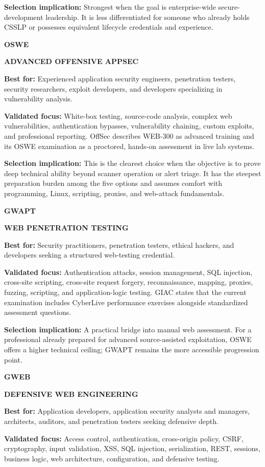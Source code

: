 \documentclass[11pt]{article}
\newcommand{\credential}[2]{%
  \Needspace{8\baselineskip}%
  \vspace{2pt}
  {\large\bfseries\color{Navy}#1}\hfill
  \colorbox{Sky}{\strut\small\bfseries\color{Blue}#2}
  \par\vspace{2pt}
}
\begin{document}
\textbf{Selection implication:} Strongest when the goal is enterprise-wide
secure-development leadership. It is less differentiated for someone who already
holds CSSLP or possesses equivalent lifecycle credentials and experience.

\credential{OSWE}{ADVANCED OFFENSIVE APPSEC}
\textbf{Best for:} Experienced application security engineers, penetration
testers, security researchers, exploit developers, and developers specializing in
vulnerability analysis.

\textbf{Validated focus:} White-box testing, source-code analysis, complex web
vulnerabilities, authentication bypasses, vulnerability chaining, custom exploits,
and professional reporting. OffSec describes WEB-300 as advanced training and its
OSWE examination as a proctored, hands-on assessment in live lab systems.

\textbf{Selection implication:} This is the clearest choice when the objective is
to prove deep technical ability beyond scanner operation or alert triage. It has
the steepest preparation burden among the five options and assumes comfort with
programming, Linux, scripting, proxies, and web-attack fundamentals.

\credential{GWAPT}{WEB PENETRATION TESTING}
\textbf{Best for:} Security practitioners, penetration testers, ethical hackers,
and developers seeking a structured web-testing credential.

\textbf{Validated focus:} Authentication attacks, session management, SQL
injection, cross-site scripting, cross-site request forgery, reconnaissance,
mapping, proxies, fuzzing, scripting, and application-logic testing. GIAC states
that the current examination includes CyberLive performance exercises alongside
standardized assessment questions.

\textbf{Selection implication:} A practical bridge into manual web assessment.
For a professional already prepared for advanced source-assisted exploitation,
OSWE offers a higher technical ceiling; GWAPT remains the more accessible
progression point.

\credential{GWEB}{DEFENSIVE WEB ENGINEERING}
\textbf{Best for:} Application developers, application security analysts and
managers, architects, auditors, and penetration testers seeking defensive depth.

\textbf{Validated focus:} Access control, authentication, cross-origin policy,
CSRF, cryptography, input validation, XSS, SQL injection, serialization, REST,
sessions, business logic, web architecture, configuration, and defensive testing.
\end{document}
